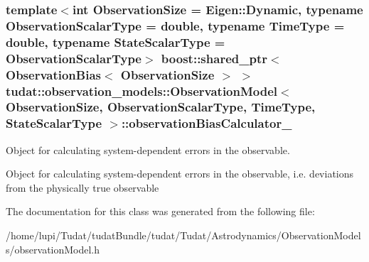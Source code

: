 \subsubsection[{\texorpdfstring{observation\+Bias\+Calculator\+\_\+}{observationBiasCalculator_}}]{\setlength{\rightskip}{0pt plus 5cm}template$<$int Observation\+Size = Eigen\+::\+Dynamic, typename Observation\+Scalar\+Type = double, typename Time\+Type = double, typename State\+Scalar\+Type = Observation\+Scalar\+Type$>$ boost\+::shared\+\_\+ptr$<$ {\bf Observation\+Bias}$<$ Observation\+Size $>$ $>$ {\bf tudat\+::observation\+\_\+models\+::\+Observation\+Model}$<$ Observation\+Size, Observation\+Scalar\+Type, Time\+Type, State\+Scalar\+Type $>$\+::observation\+Bias\+Calculator\+\_\+\hspace{0.3cm}{\ttfamily [protected]}}\hypertarget{classtudat_1_1observation__models_1_1ObservationModel_a361d74a8660b2462ed7cc98c50b2ed3d}{}\label{classtudat_1_1observation__models_1_1ObservationModel_a361d74a8660b2462ed7cc98c50b2ed3d}


Object for calculating system-\/dependent errors in the observable. 

Object for calculating system-\/dependent errors in the observable, i.\+e. deviations from the physically true observable 

The documentation for this class was generated from the following file\+:\begin{DoxyCompactItemize}
\item 
/home/lupi/\+Tudat/tudat\+Bundle/tudat/\+Tudat/\+Astrodynamics/\+Observation\+Models/observation\+Model.\+h\end{DoxyCompactItemize}
